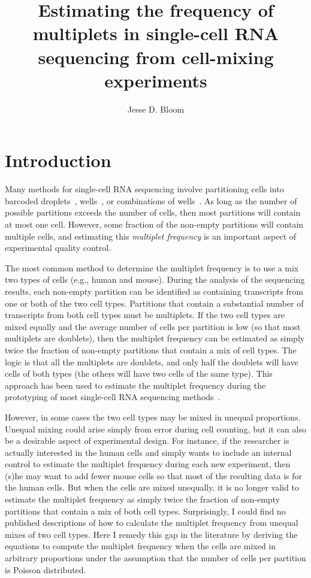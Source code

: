 \documentclass[fleqn,10pt,lineno]{wlpeerj} %
\title{Estimating the frequency of multiplets in single-cell RNA sequencing from cell-mixing experiments}
\author[1]{Jesse D. Bloom}
\affil[1]{Fred Hutch Cancer Research Center, Seattle, WA  98109}
\begin{document}
\flushbottom
\maketitle
\thispagestyle{empty}

\section*{Introduction}

Many methods for single-cell RNA sequencing involve partitioning cells into barcoded droplets~\citep{klein2015droplet,macosko2015highly,zheng2017massively}, wells~\citep{gierahn2017seq}, or combinations of wells~\citep{cao2017comprehensive}.
As long as the number of possible partitions exceeds the number of cells, then most partitions will contain at most one cell.
However, some fraction of the non-empty partitions will contain multiple cells, and estimating this \emph{multiplet frequency} is an important aspect of experimental quality control.

The most common method to determine the multiplet frequency is to use a mix two types of cells (e.g., human and mouse).
During the analysis of the sequencing results, each non-empty partition can be identified as containing transcripts from one or both of the two cell types.
Partitions that contain a substantial number of transcripts from both cell types must be multiplets.
If the two cell types are mixed equally and the average number of cells per partition is low (so that most multiplets are doublets), then the multiplet frequency can be estimated as simply twice the fraction of non-empty partitions that contain a mix of cell types.
The logic is that all the multiplets are doublets, and only half the doublets will have cells of both types (the others will have two cells of the same type).
This approach has been used to estimate the multiplet frequency during the prototyping of most single-cell RNA sequencing methods~\citep{klein2015droplet,macosko2015highly,zheng2017massively,gierahn2017seq,cao2017comprehensive}.

However, in some cases the two cell types may be mixed in unequal proportions.
Unequal mixing could arise simply from error during cell counting, but it can also be a desirable aspect of experimental design.
For instance, if the researcher is actually interested in the human cells and simply wants to include an internal control to estimate the multiplet frequency during each new experiment, then (s)he may want to add fewer mouse cells so that most of the resulting data is for the human cells.
But when the cells are mixed unequally, it is no longer valid to estimate the multiplet frequency as simply twice the fraction of non-empty partitions that contain a mix of both cell types.
Surprisingly, I could find no published descriptions of how to calculate the multiplet frequency from unequal mixes of two cell types.
Here I remedy this gap in the literature by deriving the equations to compute the multiplet frequency when the cells are mixed in arbitrary proportions under the assumption that the number of cells per partition is Poisson distributed.
\end{document}
